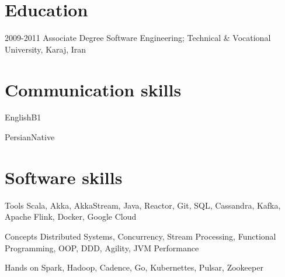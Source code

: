 \documentclass{tccv}
\begin{document}
\section{Education}

\begin{yearlist}

\item{2009-2011}
  {Associate Degree}
  {Software Engineering; Technical \& Vocational University, Karaj, Iran}

\end{yearlist}

\section{Communication skills}

\begin{factlist}
  \item{English}{B1}
  \item{Persian}{Native}
\end{factlist}

\section{Software skills}

\begin{factlist}

\item{Tools}
  {Scala, Akka, AkkaStream, Java, Reactor, Git, SQL, Cassandra, Kafka, Apache Flink, Docker, Google Cloud}

\item{Concepts}
  {Distributed Systems, Concurrency, Stream Processing,
  Functional Programming, OOP, DDD, Agility, JVM Performance}

\item{Hands on}
  {Spark, Hadoop, Cadence, Go, Kubernettes, Pulsar, Zookeeper}

\end{factlist}
\end{document}
